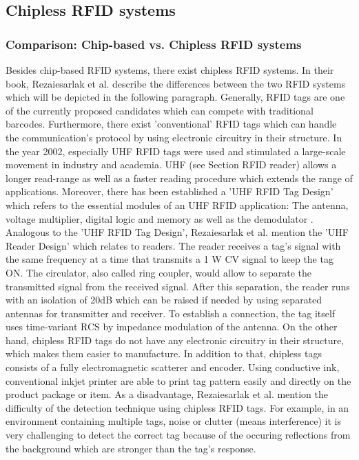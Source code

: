 \subsection{Chipless RFID systems}

\subsubsection{Comparison: Chip-based vs. Chipless RFID systems} 

Besides chip-based RFID systems, there exist chipless RFID systems. In their book, Rezaiesarlak et al. \cite{chipless} describe the differences between the two RFID systems which will be depicted in the following paragraph.
Generally, RFID tags are one of the currently proposed candidates which can compete with traditional barcodes. Furthermore, there exist 'conventional' RFID tags which can handle the communication's protocol by using electronic circuitry in their structure. In the year 2002, especially UHF RFID tags were used and stimulated a large-scale movement in industry and academia. UHF (see Section RFID reader\pageref{reader}) allows a longer read-range as well as a faster reading procedure which extends the range of applications. Moreover, there has been established a 'UHF RFID Tag Design' which refers to the essential modules of an UHF RFID application: The antenna, voltage multiplier, digital logic and memory as well as the demodulator \cite[p.12 ff.]{chipless}. Analogous to the 'UHF RFID Tag Design',  Rezaiesarlak et al. mention the 'UHF Reader Design' which relates to readers. The reader receives a tag's signal with the same frequency at a time that transmits a 1 W \ac{CV} signal to keep the tag ON. The circulator, also called ring coupler, would allow to separate the transmitted signal from the received signal. After this separation, the reader runs with an isolation of 20dB which can be raised if needed by using separated antennas for transmitter and receiver. To establish a connection, the tag itself uses time-variant \ac{RCS} by impedance modulation of the antenna. 
On the other hand, chipless RFID tags do not have any electronic circuitry in their structure, which makes them easier to manufacture. In addition to that, chipless tags consists of a fully electromagnetic scatterer and encoder. Using conductive ink, conventional inkjet printer are able to print tag pattern easily and directly on the product package or item. As a disadvantage, Rezaiesarlak et al. \cite[p.12 ff.]{chipless} mention the difficulty of the detection technique using chipless RFID tags. For example, in an environment containing multiple tags, noise or clutter (means interference) it is very challenging to detect the correct tag because of the occuring reflections from the background which are stronger than the tag's response. 

